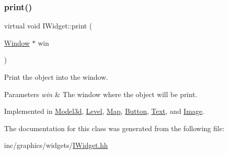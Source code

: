\subsubsection{\texorpdfstring{print()}{print()}}
{\footnotesize\ttfamily virtual void I\+Widget\+::print (\begin{DoxyParamCaption}\item[{\hyperlink{classWindow}{Window} $\ast$}]{win }\end{DoxyParamCaption})\hspace{0.3cm}{\ttfamily [pure virtual]}}



Print the object into the window. 


\begin{DoxyParams}{Parameters}
{\em win} & The window where the object will be print. \\
\hline
\end{DoxyParams}


Implemented in \hyperlink{classModel3d_ae02d86ac82ec9f435cf1ebe668f3a6dd}{Model3d}, \hyperlink{classLevel_ab8311fe64b7957d627053359331b0b6b}{Level}, \hyperlink{classMap_a031a9bf528b1d14c60931d37d68bb4e3}{Map}, \hyperlink{classButton_aaee0c62414711ae91084b05b38d0c8c5}{Button}, \hyperlink{classText_a811c378e24edd0a661cbc0e77ae4e785}{Text}, and \hyperlink{classImage_aca043fb78326d6ce135498419e2d1833}{Image}.



The documentation for this class was generated from the following file\+:\begin{DoxyCompactItemize}
\item 
inc/graphics/widgets/\hyperlink{IWidget_8hh}{I\+Widget.\+hh}\end{DoxyCompactItemize}
